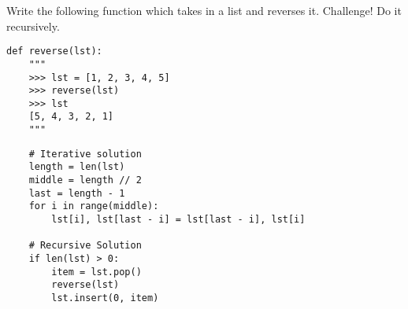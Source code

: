 \begin{blocksection}
\question Write the following function which takes in a list and reverses it. Challenge! Do it recursively.

\begin{lstlisting}
def reverse(lst):
    """
    >>> lst = [1, 2, 3, 4, 5]
    >>> reverse(lst)
    >>> lst
    [5, 4, 3, 2, 1]
    """
\end{lstlisting}

\begin{solution}[2in]
\begin{lstlisting}
    # Iterative solution
    length = len(lst)
    middle = length // 2
    last = length - 1
    for i in range(middle):
        lst[i], lst[last - i] = lst[last - i], lst[i]

    # Recursive Solution
    if len(lst) > 0:
        item = lst.pop()
        reverse(lst)
        lst.insert(0, item)
\end{lstlisting}

\end{solution}
\end{blocksection}
